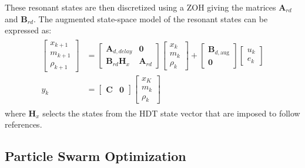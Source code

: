 These resonant states are then discretized using a ZOH giving the matrices $\mathbf{A}_{rd}$ and $\mathbf{B}_{rd}$. The augmented state-space model of the resonant states can be expressed as:
\begin{align}
    \begin{aligned}
        \begin{bmatrix}
            x_{k + 1}\\
            m_{k + 1}\\
            \rho_{k + 1}
        \end{bmatrix}
        &=
        \begin{bmatrix}
            \mathbf{A}_{d,delay} & \mathbf{0} \\
            \mathbf{B}_{rd}\mathbf{H}_x & \mathbf{A}_{rd}
        \end{bmatrix}
        \begin{bmatrix}
            x_k\\
            m_k\\
            \rho_k
        \end{bmatrix}
        +
        \begin{bmatrix}
            \mathbf{B}_{d,\text{aug}}\\
            \mathbf{0}
        \end{bmatrix}
        \begin{bmatrix}
            u_k\\
            e_k
        \end{bmatrix}
        \\
        y_k &= 
        \begin{bmatrix}
            \mathbf{C} & \mathbf{0}
        \end{bmatrix}
        \begin{bmatrix}
            x_K\\
            m_k\\
            \rho_k
        \end{bmatrix}
    \end{aligned}
\end{align}
where $\mathbf{H}_x$ selects the states from the HDT state vector that are imposed to follow references.

\subsection{Particle Swarm Optimization}

